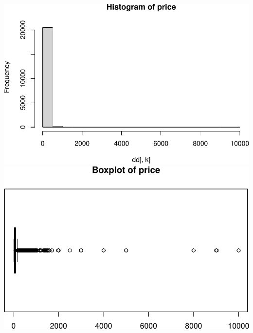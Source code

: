\includegraphics{anal_files/figure-latex/unnamed-chunk-7-26.pdf}
\includegraphics{anal_files/figure-latex/unnamed-chunk-7-27.pdf}

